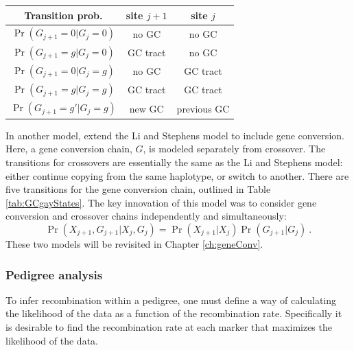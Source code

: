 \begin{table} \vspace{-20pt}
\begin{SingleSpacing}
\begin{tabular}{|c|c|c|} 
    \hline Transition prob. & site $j+1$ & site $j$ \\ \hline
    $\Pr(G_{j+1}=0|G_{j}=0)$  & no GC & no GC \\
    $\Pr(G_{j+1}=g|G_{j}=0)$  & GC tract   & no GC  \\
    $\Pr(G_{j+1}=0|G_{j}=g)$  & no GC & GC tract \\
    $\Pr(G_{j+1}=g|G_{j}=g)$  & GC tract   & GC  tract\\
    $\Pr(G_{j+1}=g'|G_{j}=g)$ &  new GC & previous GC  \\
\hline \end{tabular} \vspace{-5pt}
\end{SingleSpacing}
\vspace{-10pt}
\end{table}
%
In another model, \citet{Gay2007} extend the Li and Stephens model to include gene conversion.
Here, a gene conversion chain, $G$, is modeled separately from crossover.
The transitions for crossovers are essentially the same as the Li and Stephens model: either continue copying from the same haplotype, or switch to another.
There are five transitions for the gene conversion chain, outlined in Table \ref{tab:GCgayStates}.
The key innovation of this model was to consider gene conversion and crossover chains independently and simultaneously:
\begin{equation} \Pr(X_{j+1}, G_{j+1} | X_{j},G_{j} ) = \Pr(X_{j+1}|X_{j}) \Pr(G_{j+1}|G_{j}) ~. \end{equation}
%
These two models will be revisited in Chapter \ref{ch:geneConv}.


\subsubsection{Pedigree analysis}

To infer recombination within a pedigree, one must define a way of calculating the likelihood of the data as a function of the recombination rate.
Specifically it is desirable to find the recombination rate at each marker that maximizes the likelihood of the data.


